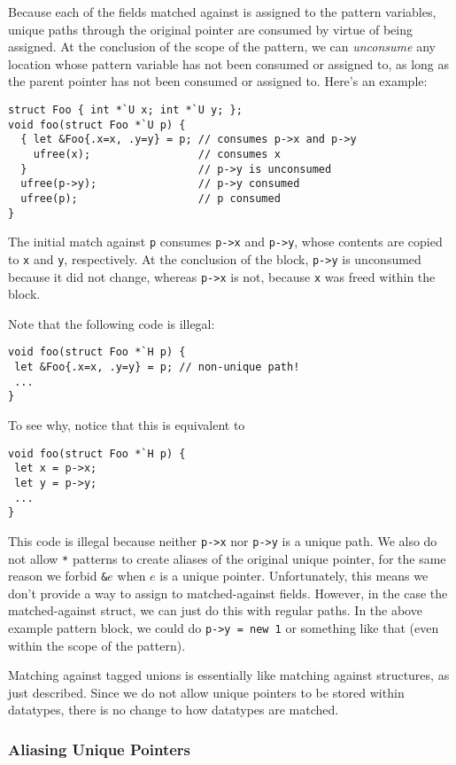 Because each of the fields matched against is assigned to the pattern
variables, unique paths through the original pointer are consumed by virtue
of being assigned.  At the conclusion of the scope of the pattern, we can
\emph{unconsume} any location whose pattern variable has not been consumed
or assigned to, as long as the parent pointer has not been consumed or
assigned to.  Here's an example:
\begin{verbatim}
struct Foo { int *`U x; int *`U y; };
void foo(struct Foo *`U p) {
  { let &Foo{.x=x, .y=y} = p; // consumes p->x and p->y
    ufree(x);                 // consumes x
  }                           // p->y is unconsumed
  ufree(p->y);                // p->y consumed
  ufree(p);                   // p consumed
}
\end{verbatim}
The initial match against \texttt{p} consumes \texttt{p->x} and
\texttt{p->y}, whose contents are copied to \texttt{x} and \texttt{y},
respectively.  At the conclusion of the block, \texttt{p->y} is unconsumed
because it did not change, whereas \texttt{p->x} is not, because \texttt{x}
was freed within the block.

Note that the following code is illegal:
\begin{verbatim}
void foo(struct Foo *`H p) {
 let &Foo{.x=x, .y=y} = p; // non-unique path!
 ...
}
\end{verbatim}
To see why, notice that this is equivalent to
\begin{verbatim}
void foo(struct Foo *`H p) {
 let x = p->x;
 let y = p->y;
 ...
}
\end{verbatim}
This code is illegal because neither \texttt{p->x} nor \texttt{p->y} is a
unique path.  We also do not allow \texttt{*} patterns to create aliases of
the original unique pointer, for the same reason we forbid \texttt{\&}$e$
when $e$ is a unique pointer.  Unfortunately, this means we don't provide a
way to assign to matched-against fields.  However, in the case the
matched-against struct, we can just do this with regular paths.  In the
above example pattern block, we could do \texttt{p->y = new 1} or something
like that (even within the scope of the pattern).

Matching against tagged unions is essentially like matching against
structures, as just described.  Since we do not allow unique pointers to be
stored within datatypes, there is no change to how datatypes are matched.

\subsubsection{Aliasing Unique Pointers}
\label{sec:alias-pats}

